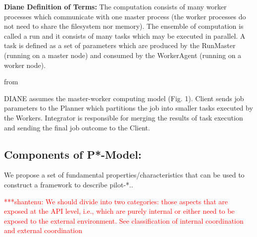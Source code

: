 \documentclass[]{article}
\newcommand{\jhanote}[1]{ {\textcolor{red} { ***shantenu: #1 }}}
\begin{document}
\textbf{Diane Definition of Terms: } The computation consists of many worker
processes which communicate with one master process (the worker processes do not
need to share the filesystem nor memory). The ensemble of computation is called
a run and it consists of many tasks which may be executed in parallel. A task is
defined as a set of parameters which are produced by the RunMaster (running on a
master node) and consumed by the WorkerAgent (running on a worker node).

from 

DIANE assumes the master-worker computing model (Fig.
1). Client sends job parameters to the Planner which partitions
the job into smaller tasks executed by the Workers. Integrator
is responsible for merging the results of task execution and
sending the final job outcome to the Client.




\subsection{Components of P*-Model:}

We propose a set of fundamental properties/characteristics that can be
used to construct a framework to describe pilot-*..

\jhanote{We should divide into two categories: those aspects that are
  exposed at the API level, i.e., which are purely internal or either
  need to be exposed to the external environment. See classification
  of internal coordination and external coordination}
\end{document}
